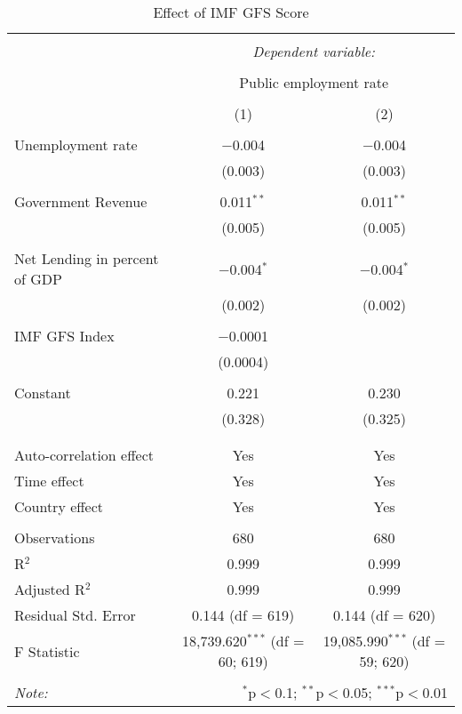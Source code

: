 
\begin{table}[!htbp] \centering 
  \caption{Effect of IMF GFS Score} 
  \label{} 
\begin{tabular}{@{\extracolsep{5pt}}lcc} 
\\[-1.8ex]\hline 
\hline \\[-1.8ex] 
 & \multicolumn{2}{c}{\textit{Dependent variable:}} \\ 
\cline{2-3} 
\\[-1.8ex] & \multicolumn{2}{c}{Public employment rate} \\ 
\\[-1.8ex] & (1) & (2)\\ 
\hline \\[-1.8ex] 
 Unemployment rate & $-$0.004 & $-$0.004 \\ 
  & (0.003) & (0.003) \\ 
  & & \\ 
 Government Revenue & 0.011$^{**}$ & 0.011$^{**}$ \\ 
  & (0.005) & (0.005) \\ 
  & & \\ 
 Net Lending in percent of GDP & $-$0.004$^{*}$ & $-$0.004$^{*}$ \\ 
  & (0.002) & (0.002) \\ 
  & & \\ 
 IMF GFS Index & $-$0.0001 &  \\ 
  & (0.0004) &  \\ 
  & & \\ 
 Constant & 0.221 & 0.230 \\ 
  & (0.328) & (0.325) \\ 
  & & \\ 
\hline \\[-1.8ex] 
Auto-correlation effect & Yes & Yes \\ 
Time effect & Yes & Yes \\ 
Country effect & Yes & Yes \\ 
\hline \\[-1.8ex] 
Observations & 680 & 680 \\ 
R$^{2}$ & 0.999 & 0.999 \\ 
Adjusted R$^{2}$ & 0.999 & 0.999 \\ 
Residual Std. Error & 0.144 (df = 619) & 0.144 (df = 620) \\ 
F Statistic & 18,739.620$^{***}$ (df = 60; 619) & 19,085.990$^{***}$ (df = 59; 620) \\ 
\hline 
\hline \\[-1.8ex] 
\textit{Note:}  & \multicolumn{2}{r}{$^{*}$p$<$0.1; $^{**}$p$<$0.05; $^{***}$p$<$0.01} \\ 
\end{tabular} 
\end{table} 
